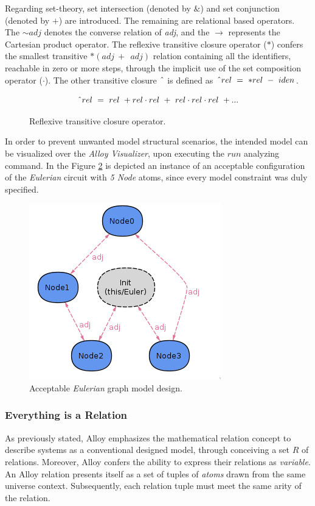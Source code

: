 Regarding set-theory, set intersection (denoted by $\&$) and set conjunction (denoted by $+$) are introduced. The remaining are relational based operators. The $\sim adj$ denotes the converse relation of \textit{adj}, and the $\rightarrow$ represents the Cartesian product operator. The reflexive transitive closure operator ($\ast$) confers the
smallest transitive $\ast(adj\ +\ ~adj)$ relation containing all the identifiers, reachable in zero or more steps, through the implicit use of the set composition operator ($\cdot$). The other transitive closure $\string^$ is defined as $\string^ rel\ =\ \ast rel\ -\ iden$.

\begin{figure}[H]
    \[\string^ rel\ =\ rel\ + rel \cdot rel\ +\ rel \cdot rel \cdot rel\ + ... \]  
\caption{Reflexive transitive closure operator.}
\label{math:alloy-transitive}
\end{figure}

In order to prevent unwanted model structural scenarios, the intended model can be visualized over the \textit{Alloy Visualizer}, upon executing the $run$ analyzing command. In the Figure \ref{fig:alloy-eulerian_1} is depicted an instance of an acceptable configuration of the \textit{Eulerian} circuit with \textit{5 Node} atoms, since every model constraint was duly specified.

\begin{figure}[H]
    \centering
    \includegraphics[width=0.4\linewidth]{images/alloy_eulerian_1.png}
    \caption{Acceptable \textit{Eulerian} graph model design.}
    \label{fig:alloy-eulerian_1}
\end{figure}


\subsubsection{Everything is a Relation}

As previously stated, Alloy emphasizes the mathematical relation concept to describe systems as a conventional designed model, through conceiving a set $R$ of relations. Moreover, Alloy confers the ability to express their relations as \textit{variable}. \cite{lwspecification} An Alloy relation presents itself as a set of tuples of \textit{atoms} drawn from the same universe context. Subsequently, each relation tuple must meet the same arity of the relation. \cite{alloy-docs}

